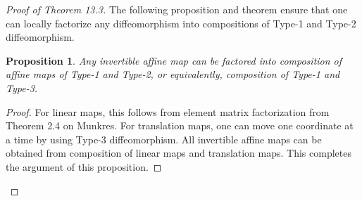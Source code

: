 \documentclass[15pt]{book}
\theoremstyle{break}
\theoremstyle{break}
\newtheorem{prop}[lem]{Proposition}
\begin{document}
\begin{proof}[Proof of Theorem 13.3]
The following proposition and theorem ensure that one can locally factorize any diffeomorphism into compositions of Type-1 and Type-2 diffeomorphism.

\begin{prop}\setlength{\leftskip}{1cm}
Any invertible affine map can be factored into composition of affine maps of Type-1 and Type-2, or equivalently, composition of Type-1 and Type-3.
\end{prop}
\begin{proof}\setlength{\leftskip}{1cm}
For linear maps, this follows from element matrix factorization from Theorem 2.4 on Munkres. For translation maps, one can move one coordinate at a time by using Type-3 diffeomorphism. All invertible affine maps can be obtained from composition of linear maps and translation maps. This completes the argument of this proposition.
\end{proof}


\end{proof}
\end{document}
